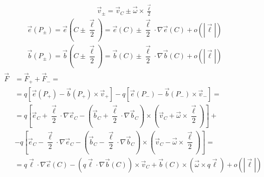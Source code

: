 \documentclass[letterpaper,10pt,italian]{jupyterBook}
\begin{document}
\sphinxAtStartPar
{}
\begin{equation*}
\begin{split}\vec{v}_{\pm} = \vec{v}_C \pm \vec{\omega} \times \frac{\vec{\ell}}{2}\end{split}
\end{equation*}\begin{equation*}
\begin{split}\vec{e}(P_{\pm}) = \vec{e}\left( C \pm \dfrac{\vec{\ell}}{2} \right) = \vec{e}(C) \pm \dfrac{\vec{\ell}}{2} \cdot \nabla \vec{e}(C) + o(|\vec{\ell}|)\end{split}
\end{equation*}\begin{equation*}
\begin{split}\vec{b}(P_{\pm}) = \vec{b}\left( C \pm \dfrac{\vec{\ell}}{2} \right) = \vec{b}(C) \pm \dfrac{\vec{\ell}}{2} \cdot \nabla \vec{b}(C) + o(|\vec{\ell}|)\end{split}
\end{equation*}
\sphinxAtStartPar
{}
\begin{equation*}
\begin{split}\begin{aligned}
  \vec{F} & = \vec{F}_+ + \vec{F}_- = \\
   & = q \left[ \vec{e}(P_+) - \vec{b}(P_+) \times \vec{v}_{+} \right] - q \left[ \vec{e}(P_-) - \vec{b}(P_-) \times \vec{v}_{-} \right] = \\
   & = q \left[ \vec{e}_C + \dfrac{\vec{\ell}}{2} \cdot \nabla \vec{e}_C - \left( \vec{b}_C + \dfrac{\vec{\ell}}{2} \cdot \nabla \vec{b}_C \right) \times \left( \vec{v}_C + \vec{\omega} \times \dfrac{\vec{\ell}}{2} \right) \right] + \\ 
   & - q \left[ \vec{e}_C - \dfrac{\vec{\ell}}{2} \cdot \nabla \vec{e}_C - \left( \vec{b}_C - \dfrac{\vec{\ell}}{2} \cdot \nabla \vec{b}_C \right) \times \left( \vec{v}_C - \vec{\omega} \times \dfrac{\vec{\ell}}{2} \right) \right] = \\
   & = q \vec{\ell} \cdot \nabla \vec{e}(C) - \left( q \vec{\ell} \cdot \nabla \vec{b}(C) \right) \times \vec{v}_C + \vec{b}(C) \times \left(  \vec{\omega} \times q \vec{\ell} \right) + o(|\vec{\ell}|)
\end{aligned}\end{split}
\end{equation*}
\sphinxAtStartPar
{}
\end{document}
